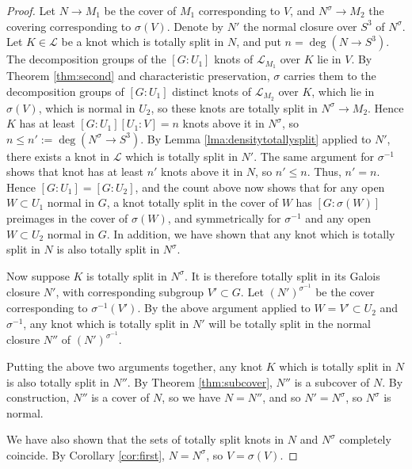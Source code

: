 \documentclass{amsart}
\theoremstyle{plain}
\theoremstyle{definition}
\theoremstyle{plain}
\theoremstyle{plain}
\theoremstyle{plain}
\theoremstyle{remark}
\theoremstyle{remark}
\theoremstyle{plain}
\theoremstyle{definition}
\theoremstyle{plain}
\theoremstyle{plain}
\theoremstyle{plain}
\numberwithin{equation}{section}
\begin{document}
\begin{proof}
Let $N\rightarrow M_1$ be the cover of $M_1$ corresponding to $V$, and $N^\sigma\rightarrow M_2$ the covering corresponding to $\sigma(V)$. Denote by $N'$ the normal closure over $S^3$ of $N^\sigma$. Let $K\in\mathcal{L}$ be a knot which is totally split in $N$, and put $n=\deg(N\rightarrow S^3)$. The decomposition groups of the $[G:U_1]$ knots of $\mathcal L_{M_1}$ over $K$ lie in $V$. By Theorem \ref{thm:second} and characteristic preservation, $\sigma$ carries them to the decomposition groups of $[G:U_1]$ distinct knots of $\mathcal L_{M_2}$ over $K$, which lie in $\sigma(V)$, which is normal in $U_2$, so these knots are totally split in $N^\sigma \to M_2$. Hence $K$ has at least $[G:U_1][U_1:V] = n$ knots above it in $N^\sigma$, so $n \leq n' := \deg(N^\sigma \to S^3)$. By Lemma \ref{lma:densitytotallysplit} applied to $N'$, there exists a knot in $\mathcal{L}$ which is totally split in $N'$. The same argument for $\sigma^{-1}$ shows that knot has at least $n'$ knots above it in $N$, so $n' \leq n$. Thus, $n' = n$. Hence $[G:U_1] = [G:U_2]$, and the count above now shows that for any open $W \subset U_1$ normal in $G$, a knot totally split in the cover of $W$ has $[G:\sigma(W)]$ preimages in the cover of $\sigma(W)$, and symmetrically for $\sigma^{-1}$ and any open $W \subset U_2$ normal in $G$. In addition, we have shown that any knot which is totally split in $N$ is also totally split in $N^\sigma$.

\medskip

Now suppose $K$ is totally split in $N^\sigma$. It is therefore totally split in its Galois closure $N'$, with corresponding subgroup $V' \subset G$. Let $(N')^{\sigma^{-1}}$ be the cover corresponding to $\sigma^{-1}(V')$. By the above argument applied to $W = V' \subset U_2$ and $\sigma^{-1}$, any knot which is totally split in $N'$ will be totally split in the normal closure $N''$ of $(N')^{\sigma^{-1}}$.

\medskip

Putting the above two arguments together, any knot $K$ which is totally split in $N$ is also totally split in $N''$. By Theorem \ref{thm:subcover}, $N''$ is a subcover of $N$. By construction, $N''$ is a cover of $N$, so we have $N = N''$, and so $N' = N^\sigma$, so $N^\sigma$ is normal. 

\medskip

We have also shown that the sets of totally split knots in $N$ and $N^\sigma$ completely coincide. By Corollary \ref{cor:first}, $N = N^\sigma$, so $V = \sigma(V)$.
\end{proof}
\end{document}
